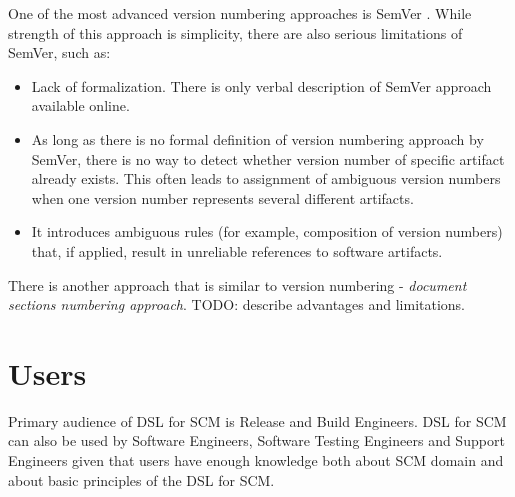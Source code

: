 \documentclass[11pt]{article}
\begin{document}
One of the most advanced version numbering approaches is SemVer \cite{semver}. While strength of this approach is simplicity, there are also serious limitations of SemVer, such as:
\begin{itemize}
\item Lack of formalization. There is only verbal description of SemVer approach available online. 
\item As long as there is no formal definition of version numbering approach by SemVer, there is no way to detect whether version number of specific artifact already exists. This often leads to assignment of ambiguous version numbers when one version number represents several different artifacts.
\item It introduces ambiguous rules (for example, composition of version numbers) that, if applied, result in unreliable references to software artifacts.
\end{itemize}

There is another approach that is similar to version numbering - \textit{document sections numbering approach}. TODO: describe advantages and limitations.

\section{Users}
\label{sec:users}

Primary audience of DSL for SCM is Release and Build Engineers. DSL for SCM can also be used by Software Engineers, Software Testing Engineers and Support Engineers given that users have enough knowledge both about SCM domain and about basic principles of the DSL for SCM. 
\end{document}
